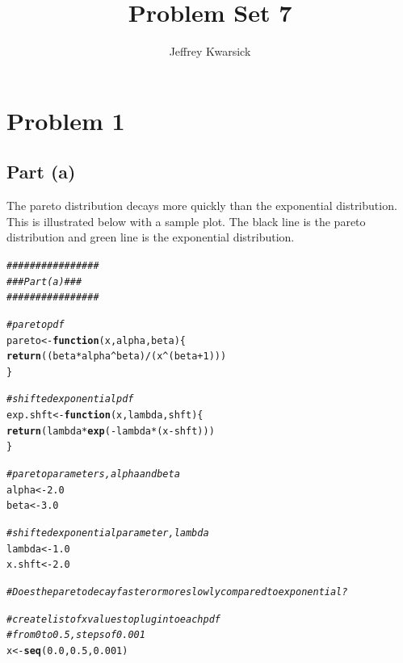 \documentclass{article}\usepackage[]{graphicx}\usepackage[]{color}
\makeatletter
\newcommand{\hlnum}[1]{\textcolor[rgb]{0.686,0.059,0.569}{#1}}%
\newcommand{\hlcom}[1]{\textcolor[rgb]{0.678,0.584,0.686}{\textit{#1}}}%
\newcommand{\hlopt}[1]{\textcolor[rgb]{0,0,0}{#1}}%
\newcommand{\hlstd}[1]{\textcolor[rgb]{0.345,0.345,0.345}{#1}}%
\newcommand{\hlkwa}[1]{\textcolor[rgb]{0.161,0.373,0.58}{\textbf{#1}}}%
\newcommand{\hlkwb}[1]{\textcolor[rgb]{0.69,0.353,0.396}{#1}}%
\newcommand{\hlkwc}[1]{\textcolor[rgb]{0.333,0.667,0.333}{#1}}%
\newcommand{\hlkwd}[1]{\textcolor[rgb]{0.737,0.353,0.396}{\textbf{#1}}}%
\newenvironment{kframe}{%
 \def\at@end@of@kframe{}%
 \ifinner\ifhmode%
  \def\at@end@of@kframe{\end{minipage}}%
  \begin{minipage}{\columnwidth}%
 \fi\fi%
 \def\FrameCommand##1{\hskip\@totalleftmargin \hskip-\fboxsep
 \colorbox{shadecolor}{##1}\hskip-\fboxsep
     \hskip-\linewidth \hskip-\@totalleftmargin \hskip\columnwidth}%
 \MakeFramed {\advance\hsize-\width
   \@totalleftmargin\z@ \linewidth\hsize
   \@setminipage}}%
 {\par\unskip\endMakeFramed%
 \at@end@of@kframe}
\newenvironment{knitrout}{}{} %
\makeatother
\begin{document}
\title{Problem Set 7}
\author{Jeffrey Kwarsick}

\section{Problem 1}
\subsection{Part (a)}
The pareto distribution decays more quickly than the exponential distribution.  This is illustrated below with a sample plot.  The black line is the pareto distribution and green line is the exponential distribution.
\begin{knitrout}
\color{fgcolor}\begin{kframe}
\begin{alltt}
\hlcom{################}
\hlcom{### Part (a) ###}
\hlcom{################}

\hlcom{#pareto pdf}
\hlstd{pareto} \hlkwb{<-} \hlkwa{function}\hlstd{(}\hlkwc{x}\hlstd{,} \hlkwc{alpha}\hlstd{,} \hlkwc{beta}\hlstd{) \{}
  \hlkwd{return}\hlstd{( (beta}\hlopt{*}\hlstd{alpha}\hlopt{^}\hlstd{beta)}\hlopt{/}\hlstd{(x}\hlopt{^}\hlstd{(beta}\hlopt{+}\hlnum{1}\hlstd{)) )}
\hlstd{\}}

\hlcom{#shifted exponential pdf}
\hlstd{exp.shft} \hlkwb{<-} \hlkwa{function}\hlstd{(}\hlkwc{x}\hlstd{,} \hlkwc{lambda}\hlstd{,} \hlkwc{shft}\hlstd{) \{}
  \hlkwd{return}\hlstd{( lambda}\hlopt{*}\hlkwd{exp}\hlstd{(}\hlopt{-}\hlstd{lambda}\hlopt{*}\hlstd{(x}\hlopt{-}\hlstd{shft)) )}
\hlstd{\}}

\hlcom{#pareto parameters, alpha and beta}
\hlstd{alpha}  \hlkwb{<-} \hlnum{2.0}
\hlstd{beta}   \hlkwb{<-} \hlnum{3.0}

\hlcom{#shifted exponential parameter, lambda}
\hlstd{lambda} \hlkwb{<-} \hlnum{1.0}
\hlstd{x.shft} \hlkwb{<-} \hlnum{2.0}

\hlcom{#Does the pareto decay faster or more slowly compared to exponential?}

\hlcom{#create list of x values to plug into each pdf}
\hlcom{#from 0 to 0.5, steps of 0.001}
\hlstd{x} \hlkwb{<-} \hlkwd{seq}\hlstd{(}\hlnum{0.0}\hlstd{,} \hlnum{0.5}\hlstd{,} \hlnum{0.001}\hlstd{)}


\end{alltt}
\end{kframe}
\end{knitrout}
\end{document}
